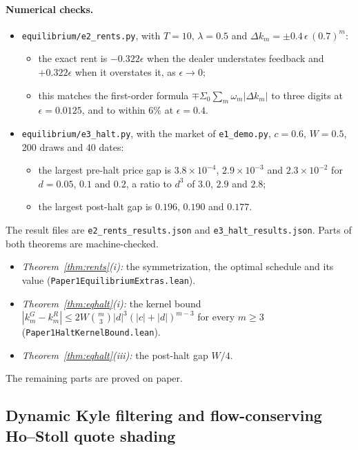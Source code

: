 \documentclass[12pt]{article}
\theoremstyle{definition}
\theoremstyle{remark}
\begin{document}
\paragraph{Numerical checks.}
\begin{itemize}[itemsep=1pt,topsep=2pt]
\item \nolinkurl{equilibrium/e2_rents.py}, with $T=10$, $\lambda=0.5$ and $\Delta k_m=\pm0.4\,\epsilon\,(0.7)^m$:
  \begin{itemize}[itemsep=1pt,topsep=1pt]
  \item the exact rent is $-0.322\epsilon$ when the dealer understates feedback and $+0.322\epsilon$ when it overstates it, as $\epsilon\to0$;
  \item this matches the first-order formula $\mp\Sigma_0\sum_m\omega_m|\Delta k_m|$ to three digits at $\epsilon=0.0125$, and to within 6\% at $\epsilon=0.4$.
  \end{itemize}
\item \nolinkurl{equilibrium/e3_halt.py}, with the market of \nolinkurl{e1_demo.py}, $c=0.6$, $W=0.5$, 200 draws and 40 dates:
  \begin{itemize}[itemsep=1pt,topsep=1pt]
  \item the largest pre-halt price gap is $3.8\times10^{-4}$, $2.9\times10^{-3}$ and $2.3\times10^{-2}$ for $d=0.05$, $0.1$ and $0.2$, a ratio to $d^3$ of $3.0$, $2.9$ and $2.8$;
  \item the largest post-halt gap is $0.196$, $0.190$ and $0.177$.
  \end{itemize}
\end{itemize}
The result files are \nolinkurl{e2_rents_results.json} and \nolinkurl{e3_halt_results.json}. Parts of both theorems are machine-checked.
\begin{itemize}[itemsep=1pt,topsep=2pt]
\item \emph{Theorem~\ref{thm:rents}(i):} the symmetrization, the optimal schedule and its value (\nolinkurl{Paper1EquilibriumExtras.lean}).
\item \emph{Theorem~\ref{thm:eqhalt}(i):} the kernel bound $|k^G_m-k^R_m|\le2W\binom m3|d|^3(|c|+|d|)^{m-3}$ for every $m\ge3$ (\nolinkurl{Paper1HaltKernelBound.lean}).
\item \emph{Theorem~\ref{thm:eqhalt}(iii):} the post-halt gap $W/4$.
\end{itemize}
The remaining parts are proved on paper.




\subsection{Dynamic Kyle filtering and flow-conserving Ho--Stoll quote shading}\label{sec:kyle_hostoll}
\end{document}
